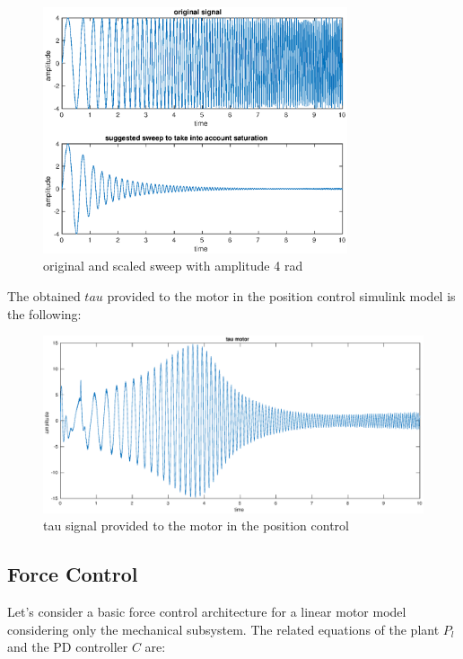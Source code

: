 \documentclass[a4paper,11pt]{article}
\begin{document}
\begin{figure}[H]
\begin{center}
\includegraphics[width=0.8\textwidth]{images/position_scaled.eps}
\end{center}
\caption{original and scaled sweep with amplitude 4 rad}
\label{fig:position_ref}
\end{figure}

\noindent The obtained $tau$ provided to the motor in the position control simulink model is the following:

\begin{figure}[H]
\begin{center}
\includegraphics[width=1.0\textwidth]{images/position_tau.eps}
\end{center}
\caption{tau signal provided to the motor in the position control}
\label{fig:position_tau}
\end{figure}

\newpage
\subsection{Force Control}
Let's consider a basic force control architecture for a linear motor model considering only the mechanical subsystem. The related equations of the plant $P_l$ and the PD controller $C$ are:
\end{document}
